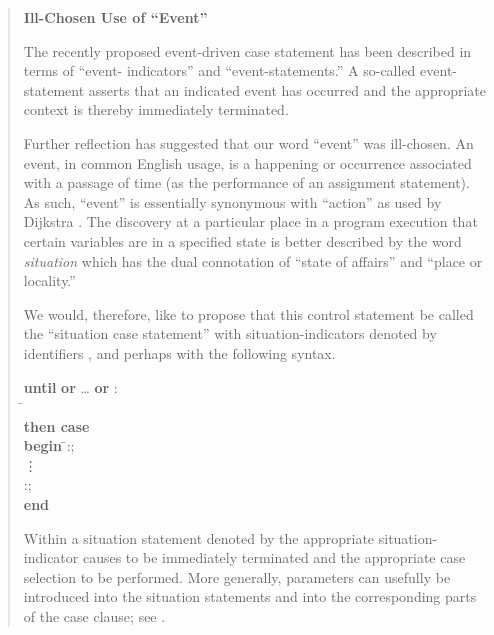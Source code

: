\documentclass[10pt]{amsart}
\begin{document}
\begin{quotation}
\begin{offside}
\textbf{Ill-Chosen Use of ``Event''}

The recently proposed event-driven case statement \cite{ZahnCT74} has
been describ\-ed \cite{ZahnCT74,KnuthDE74} in terms of ``event-
indicators'' and ``event-statements.''  A so-called event-statement
asserts that an indicated event has occurred and the appropriate
context is thereby immediately terminated.

Further reflection has suggested that our word ``event'' was
ill-chosen.  An event, in common English usage, is a happening or
occurrence associated with a passage of time (as the performance of an
assignment statement). As such, ``event'' is essentially synonymous
with ``action'' as used by Dijkstra \cite{DijkstraEW72}. The discovery
at a particular place in a program execution that certain variables
are in a specified state is better described by the word
\emph{situation} which has the dual connotation \cite{ACDict} of
``state of affairs'' and ``place or locality.''

We would, therefore, like to propose that this control statement be
called the ``situation case statement'' with situation-indicators
denoted by identifiers , and perhaps with the following
syntax.\vspace{1ex}
\noindent
\begin{tabbing}
\textbf{until}  \textbf{or}  \ldots{}
\textbf{or} :\\
\hspace*{2.5em}\=\\
\textbf{then case}\\
\>\textbf{begin} \=:;\\
\>\>\vdots\\
\>\>:;\\
\>\textbf{end}
\end{tabbing}

\def\hyph{-\penalty0\hskip0pt\relax}%

Within  a situation statement denoted by the
appropriate sit\-uation\hyph indicator causes  to be
immediately terminated and the appropriate case selection to be
performed. More generally, parameters can usefully be introduced into
the situation statements and into the corresponding parts of the case
clause; see \cite{KnuthDE74}.


\end{offside}
\end{quotation}
\end{document}
